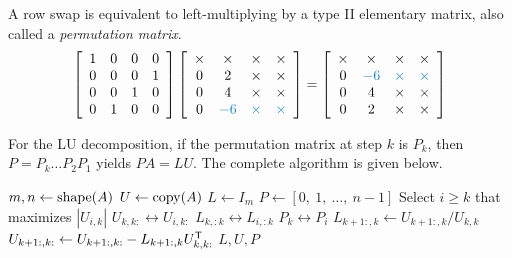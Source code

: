 A row swap is equivalent to left-multiplying by a type II elementary matrix, also called a \emph{permutation matrix}.
%
\begin{align*}
\left[\begin{array}{cccc}
1 & 0 & 0 & 0 \\
0 & 0 & 0 & 1 \\
0 & 0 & 1 & 0 \\
0 & 1 & 0 & 0 \\
\end{array}\right]
\left[\begin{array}{cccc}
\times & \times & \times & \times\\
0 & 2 & \times & \times\\
0 & 4 & \times & \times\\
0 & \textcolor{blue}{-6} & \textcolor{blue}\times & \textcolor{blue}\times\\
\end{array}\right]
=
\left[\begin{array}{cccc}
\times & \times & \times & \times\\
0 & \textcolor{blue}{-6} & \textcolor{blue}\times & \textcolor{blue}\times\\
0 & 4 & \times & \times\\
0 & 2 & \times & \times\\
\end{array}\right]
\end{align*}

For the LU decomposition, if the permutation matrix at step $k$ is $P_k$, then $P = P_k\ldots P_2P_1$ yields $PA = LU$.
The complete algorithm is given below.

\begin{algorithm}[H]
\begin{algorithmic}[1]
    \State $m, n \gets \mathrm{shape}(A)$
    \State $U \gets \mathrm{copy}(A)$
    \State $L \gets I_m$
    \State $P \gets [0,\ 1,\ \ldots,\ n-1]$
        \State Select $i \ge k$ that maximizes $|U_{i,k}|$
        \State $U_{k,k:} \leftrightarrow U_{i,k:}$
        \State $L_{k,:k} \leftrightarrow L_{i,:k}$
        \State $P_{k} \leftrightarrow P_{i}$
        \State $L_{k+1:,k} \gets U_{k+1:,k}/U_{k,k}$
        \State $U_{k+1:,k:} \gets U_{k+1:,k:} - L_{k+1:,k}U_{k,k:}^{\mathsf T}$
    \EndFor
    \State {} $L, U, P$
\EndProcedure
\end{algorithmic}
\caption{}
\end{algorithm}

